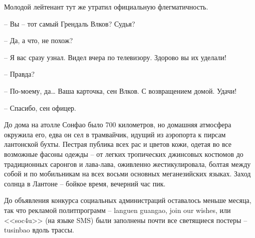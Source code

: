 Молодой лейтенант тут же утратил официальную флегматичность.

-- Вы -- тот самый Грендаль Влков? Судья?

-- Да, а что, не похож?

-- Я вас сразу узнал. Видел вчера по телевизору. Здорово вы их уделали!

-- Правда?

-- По-моему, да\ldots{} Ваша карточка, сен Влков. С возвращением домой. Удачи!

-- Спасибо, сен офицер.

До дома на атолле Сонфао было 700 километров, но домашняя атмосфера окружила его, едва он сел в трамвайчик, идущий из аэропорта к пирсам лантонской бухты. Пестрая публика всех рас и цветов кожи, одетая во все возможные фасоны одежды -- от легких тропических джинсовых костюмов до традиционных саронгов и лава-лава, оживленно жестикулировала, болтая между собой и по мобильникам на всех восьми основных меганезийских языках. Заход солнца в Лантоне -- бойкое время, вечерний час пик.

До объявления конкурса социальных администраций оставалось меньше месяца, так что рекламой политпрограмм -- languen guangao, join our wishes, или <<soc4u>> (на языке SMS) были заполнены почти все светящиеся постеры -- tusinbao вдоль трассы.

